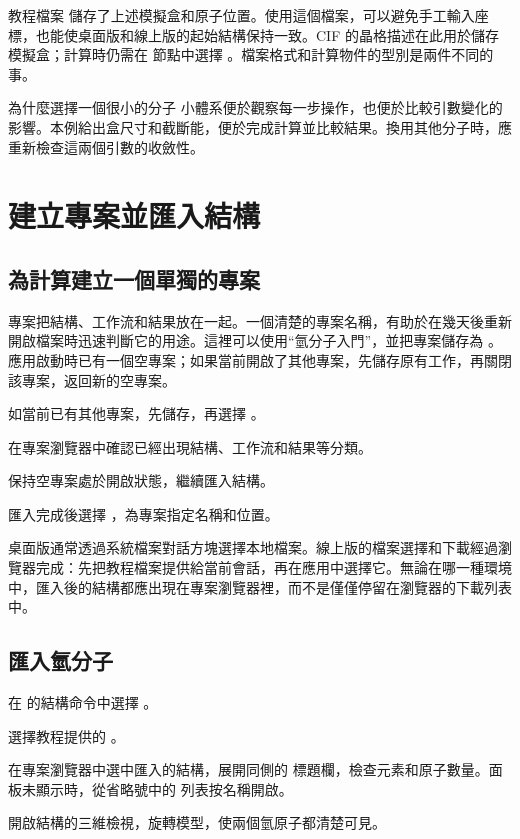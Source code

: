 教程檔案  儲存了上述模擬盒和原子位置。使用這個檔案，可以避免手工輸入座標，也能使桌面版和線上版的起始結構保持一致。CIF 的晶格描述在此用於儲存模擬盒；計算時仍需在  節點中選擇 。檔案格式和計算物件的型別是兩件不同的事。

\begin{notebox}{為什麼選擇一個很小的分子}
小體系便於觀察每一步操作，也便於比較引數變化的影響。本例給出盒尺寸和截斷能，便於完成計算並比較結果。換用其他分子時，應重新檢查這兩個引數的收斂性。
\end{notebox}

\section{建立專案並匯入結構}

\subsection{為計算建立一個單獨的專案}

專案把結構、工作流和結果放在一起。一個清楚的專案名稱，有助於在幾天後重新開啟檔案時迅速判斷它的用途。這裡可以使用“氫分子入門”，並把專案儲存為 。應用啟動時已有一個空專案；如果當前開啟了其他專案，先儲存原有工作，再關閉該專案，返回新的空專案。

\begin{steps}
\item 如當前已有其他專案，先儲存，再選擇 。
\item 在專案瀏覽器中確認已經出現結構、工作流和結果等分類。
\item 保持空專案處於開啟狀態，繼續匯入結構。
\item 匯入完成後選擇 ，為專案指定名稱和位置。
\end{steps}

桌面版通常透過系統檔案對話方塊選擇本地檔案。線上版的檔案選擇和下載經過瀏覽器完成：先把教程檔案提供給當前會話，再在應用中選擇它。無論在哪一種環境中，匯入後的結構都應出現在專案瀏覽器裡，而不是僅僅停留在瀏覽器的下載列表中。

\subsection{匯入氫分子}

\begin{steps}
\item 在  的結構命令中選擇 。
\item 選擇教程提供的 。
\item 在專案瀏覽器中選中匯入的結構，展開同側的  標題欄，檢查元素和原子數量。面板未顯示時，從省略號中的  列表按名稱開啟。
\item 開啟結構的三維檢視，旋轉模型，使兩個氫原子都清楚可見。
\end{steps}

